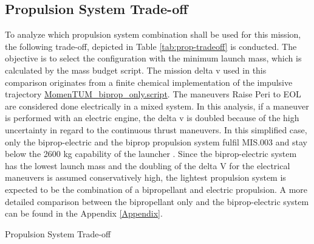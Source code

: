 \documentclass[conference]{IEEEtran}
\begin{document}
\subsection{Propulsion System Trade-off}
\label{subsection:PropSysTradeOff}

To analyze which propulsion system combination shall be used for this mission, the following trade-off, depicted in Table \ref{tab:prop-tradeoff} is conducted. The objective is to select the configuration with the minimum launch mass, which is calculated by the mass budget script. The mission delta v used in this comparison originates from a finite chemical implementation of the impulsive trajectory \href{https://github.com/Sven-J-Steinert/MomenTUM/blob/main/GMAT/MomenTUM_biprop_only.script}{\colorbox{codegray}{MomenTUM\_biprop\_only.script}}. The maneuvers Raise Peri to EOL are considered done electrically in a mixed system. In this analysis, if a maneuver is performed with an electric engine, the delta v is doubled because of the high uncertainty in regard to the continuous thrust maneuvers. In this simplified case, only the biprop-electric and the biprop propulsion system fulfil MIS.003 and stay below the 2600 kg capability of the launcher \cite{Arianspace.2016}. Since the biprop-electric system has the lowest launch mass and the doubling of the delta V for the electrical maneuvers is assumed conservatively high, the lightest propulsion system is expected to be the combination of a bipropellant and electric propulsion. A more detailed comparison between the bipropellant only and the biprop-electric system can be found in the Appendix \ref{Appendix}.

\begin{table}[H]
\caption{Propulsion System Trade-off}
\label{tab:prop-tradeoff}
\end{table}
\end{document}
